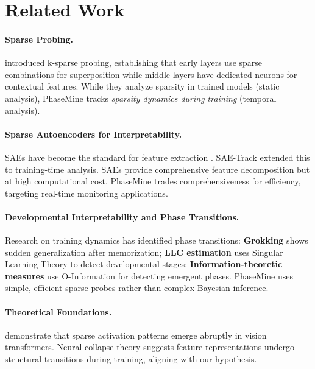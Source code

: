 \documentclass{article}
\begin{document}
\section{Related Work}

\paragraph{Sparse Probing.} \cite{gurnee2023finding} introduced k-sparse probing, establishing that early layers use sparse combinations for superposition while middle layers have dedicated neurons for contextual features. While they analyze sparsity in trained models (static analysis), PhaseMine tracks \textit{sparsity dynamics during training} (temporal analysis).

\paragraph{Sparse Autoencoders for Interpretability.} SAEs have become the standard for feature extraction \cite{bricken2023towards, cunningham2023sparse, gao2024scaling}. SAE-Track \cite{oi2024tracking} extended this to training-time analysis. SAEs provide comprehensive feature decomposition but at high computational cost. PhaseMine trades comprehensiveness for efficiency, targeting real-time monitoring applications.

\paragraph{Developmental Interpretability and Phase Transitions.} Research on training dynamics has identified phase transitions: \textbf{Grokking} \cite{power2022grokking} shows sudden generalization after memorization; \textbf{LLC estimation} \cite{hoogland2024developmental} uses Singular Learning Theory to detect developmental stages; \textbf{Information-theoretic measures} \cite{imani2024grokking} use O-Information for detecting emergent phases. PhaseMine uses simple, efficient sparse probes rather than complex Bayesian inference.

\paragraph{Theoretical Foundations.} \cite{robinson2024sparse} demonstrate that sparse activation patterns emerge abruptly in vision transformers. Neural collapse theory \cite{papyan2020prevalence} suggests feature representations undergo structural transitions during training, aligning with our hypothesis.
\end{document}
